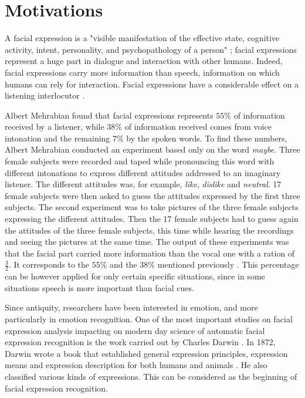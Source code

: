 \chapter{Motivations}
\label{ch:motivations}

\noindent A facial expression is a "visible manifestation of the effective state, cognitive activity, intent, personality, and psychopathology of a person" \cite{DON99}; facial expressions represent a huge part in dialogue and interaction with other humans. Indeed, facial expressions carry more information than speech, information on which humans can rely for interaction. Facial expressions have a considerable effect on a listening interlocutor \cite{PAN00}. 
\newline

\noindent Albert Mehrabian found that facial expressions represents $ 55\% $ of information received by a listener, while $ 38\% $ of information received comes from voice intonation and the remaining $ 7\% $ by the spoken words. To find these numbers, Albert Mehrabian conducted an experiment based only on the word \textit{maybe}. Three female subjects were recorded and taped while pronouncing this word with different intonations to express different attitudes addressed to an imaginary listener. The different attitudes was, for example, \textit{like}, \textit{dislike} and \textit{neutral}. 17 female subjects were then asked to guess the attitudes expressed by the first three subjects. The second experiment was to take pictures of the three female subjects expressing the different attitudes. Then the 17 female subjects had to guess again the attitudes of the three female subjects, this time while hearing the recordings and seeing the pictures at the same time. The output of these experiments was that the facial part carried more information than the vocal one with a ration of $ \frac{3}{2} $. It corresponds to the $ 55\% $ and the $ 38\% $ mentioned previously \cite{PAN00}. This percentage can be however applied for only certain specific situations, since in some situations speech is more important than facial cues.
\newline

\noindent Since antiquity, researchers have been interested in emotion, and more particularly in emotion recognition. One of the most important studies on facial expression analysis impacting on modern day science of automatic facial expression recognition is the work carried out by Charles Darwin \cite{BET12}. In 1872, Darwin wrote a book that established general expression principles, expression means and expression description for both humans and animals \cite{DAR04}. He also classified various kinds of expressions. This can be considered as the beginning of facial expression recognition.
\newline

